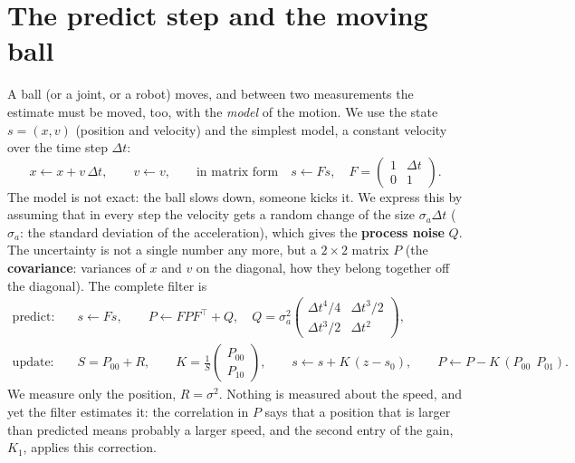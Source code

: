 \section*{The predict step and the moving ball}
A ball (or a joint, or a robot) moves, and between two measurements the estimate must be moved, too, with the \emph{model} of the motion. We use the state $s=(x,v)$ (position and velocity) and the simplest model, a constant velocity over the time step $\Delta t$:
\[
x\leftarrow x+v\,\Delta t,\qquad v\leftarrow v ,\qquad\text{in matrix form}\quad s\leftarrow F s,\quad F=\begin{pmatrix}1&\Delta t\\0&1\end{pmatrix}.
\]
The model is not exact: the ball slows down, someone kicks it. We express this by assuming that in every step the velocity gets a random change of the size $\sigma_a\Delta t$ ($\sigma_a$: the standard deviation of the acceleration), which gives the \textbf{process noise} $Q$. The uncertainty is not a single number any more, but a $2\times2$ matrix $P$ (the \textbf{covariance}: variances of $x$ and $v$ on the diagonal, how they belong together off the diagonal). The complete filter is
\begin{align*}
\text{predict:}\quad & s\leftarrow Fs,\qquad P\leftarrow FPF^{\top}+Q,\quad
Q=\sigma_a^{2}\begin{pmatrix}\Delta t^4/4&\Delta t^3/2\\ \Delta t^3/2&\Delta t^2\end{pmatrix},\\
\text{update:}\quad & S=P_{00}+R,\qquad K=\frac{1}{S}\begin{pmatrix}P_{00}\\P_{10}\end{pmatrix},\qquad s\leftarrow s+K\,(z-s_0),\qquad P\leftarrow P-K\,(P_{00}\ \ P_{01}).
\end{align*}
We measure only the position, $R=\sigma^2$. Nothing is measured about the speed, and yet the filter estimates it: the correlation in $P$ says that a position that is larger than predicted means probably a larger speed, and the second entry of the gain, $K_1$, applies this correction.

